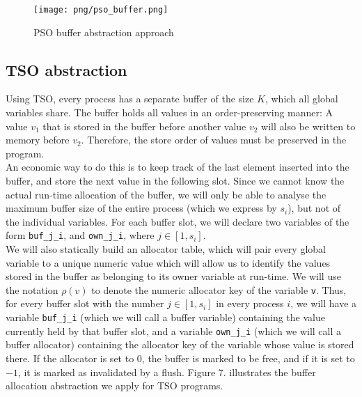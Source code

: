 \begin{figure}[h]

	\caption{PSO buffer abstraction approach}
	\centering
	\texttt{[image: png/pso\_buffer.png]}

\end{figure}

\pagebreak

\subsection{TSO abstraction}

Using TSO, every process has a separate buffer of the size $K$, which all global variables share. The buffer holds all values in an order-preserving manner: A value $v_{1}$ that is stored in the buffer before another value $v_{2}$ will also be written to memory before $v_{2}$. Therefore, the store order of values must be preserved in the program.\\

An economic way to do this is to keep track of the last element inserted into the buffer, and store the next value in the following slot. Since we cannot know the actual run-time allocation of the buffer, we will only be able to analyse the maximum buffer size of the entire process (which we express by $s_{i}$), but not of the individual variables. For each buffer slot, we will declare two variables of the form \lstinline$buf_j_i$, and \lstinline$own_j_i$, where $j \in [1, s_{i}]$.\\

We will also statically build an allocator table, which will pair every global variable to a unique numeric value which will allow us to identify the values stored in the buffer as belonging to its owner variable at run-time. We will use the notation $\rho(v)$ to denote the numeric allocator key of the variable \lstinline$v$. Thus, for every buffer slot with the number $j \in [1, s_{i}]$ in every process $i$, we will have a variable \lstinline$buf_j_i$ (which we will call a buffer variable) containing the value currently held by that buffer slot, and a variable \lstinline$own_j_i$ (which we will call a buffer allocator) containing the allocator key of the variable whose value is stored there. If the allocator is set to $0$, the buffer is marked to be free, and if it is set to $-1$, it is marked as invalidated by a flush. Figure 7. illustrates the buffer allocation abstraction we apply for TSO programs.\\

